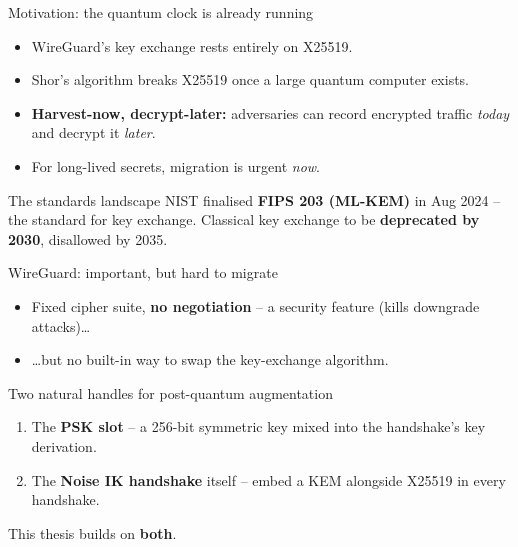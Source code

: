 \documentclass[aspectratio=169,11pt]{beamer}
\begin{document}
\begin{frame}{Motivation: the quantum clock is already running}
  \begin{itemize}
    \item WireGuard's key exchange rests \alert{entirely on X25519}.
    \item Shor's algorithm breaks X25519 once a large quantum computer exists.
    \item \textbf{Harvest-now, decrypt-later:} adversaries can record encrypted
          traffic \emph{today} and decrypt it \emph{later}.
    \item[$\Rightarrow$] For long-lived secrets, migration is urgent \emph{now}.
  \end{itemize}
  \vfill
  \begin{block}{The standards landscape}
    NIST finalised \textbf{FIPS 203 (ML-KEM)} in Aug 2024 -- the standard for
    key exchange. Classical key exchange to be \textbf{deprecated by 2030},
    disallowed by 2035.
  \end{block}
\end{frame}

\begin{frame}{WireGuard: important, but hard to migrate}
  \begin{itemize}
    \item Fixed cipher suite, \textbf{no negotiation} -- a security feature
          (kills downgrade attacks)\ldots
    \item \ldots but \alert{no built-in way to swap the key-exchange algorithm}.
  \end{itemize}
  \vfill
  \begin{block}{Two natural handles for post-quantum augmentation}
    \begin{enumerate}
      \item The \textbf{PSK slot} -- a 256-bit symmetric key mixed into the
            handshake's key derivation.
      \item The \textbf{Noise IK handshake} itself -- embed a KEM alongside
            X25519 in every handshake.
    \end{enumerate}
  \end{block}
  \vfill
  \centering\small\color{pqgray} This thesis builds on \textbf{both}.
\end{frame}
\end{document}
